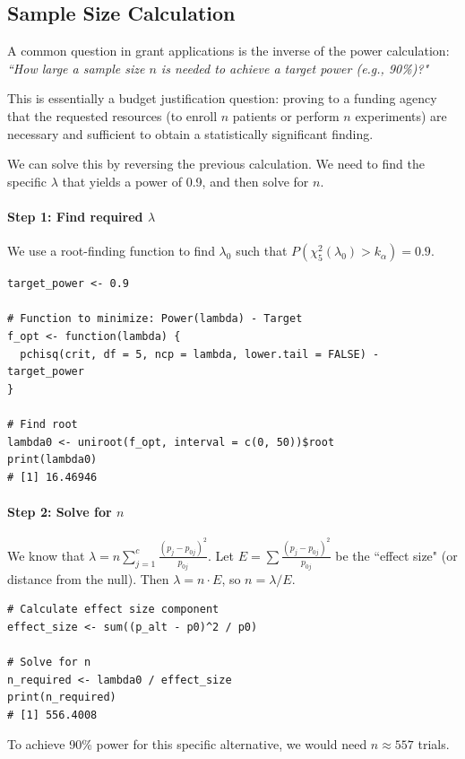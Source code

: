 \subsection{Sample Size Calculation}
\label{sub:Sample_Size}

A common question in grant applications is the inverse of the power calculation: \textit{``How large a sample size $n$ is needed to achieve a target power (e.g., 90\%)?"}

This is essentially a budget justification question: proving to a funding agency that the requested resources (to enroll $n$ patients or perform $n$ experiments) are necessary and sufficient to obtain a statistically significant finding.

We can solve this by reversing the previous calculation. We need to find the specific $\lambda$ that yields a power of 0.9, and then solve for $n$.

\paragraph{Step 1: Find required $\lambda$}
We use a root-finding function to find $\lambda_0$ such that $P(\chi^2_{5}(\lambda_0) > k_\alpha) = 0.9$.

\begin{verbatim}
target_power <- 0.9

# Function to minimize: Power(lambda) - Target
f_opt <- function(lambda) {
  pchisq(crit, df = 5, ncp = lambda, lower.tail = FALSE) - target_power
}

# Find root
lambda0 <- uniroot(f_opt, interval = c(0, 50))$root
print(lambda0)
# [1] 16.46946
\end{verbatim}

\paragraph{Step 2: Solve for $n$}
We know that $\lambda = n \sum_{j=1}^c \frac{(p_j - p_{0j})^2}{p_{0j}}$. Let $E = \sum \frac{(p_j - p_{0j})^2}{p_{0j}}$ be the ``effect size" (or distance from the null). Then $\lambda = n \cdot E$, so $n = \lambda / E$.

\begin{verbatim}
# Calculate effect size component
effect_size <- sum((p_alt - p0)^2 / p0)

# Solve for n
n_required <- lambda0 / effect_size
print(n_required)
# [1] 556.4008
\end{verbatim}

To achieve 90\% power for this specific alternative, we would need $n \approx 557$ trials.

